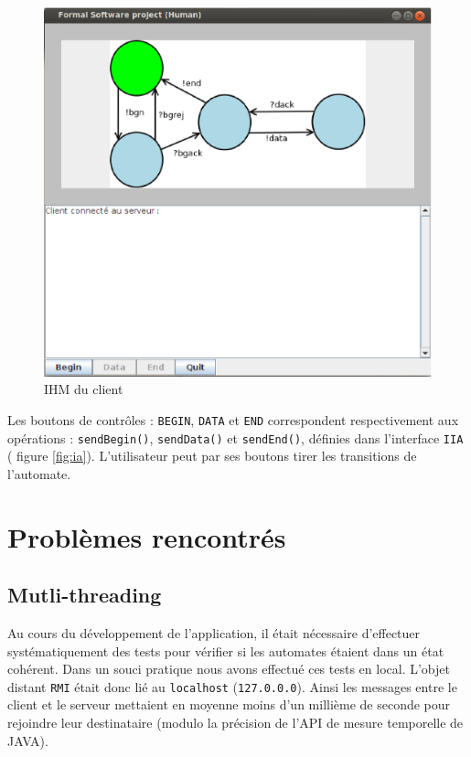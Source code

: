  \begin{figure}[htb]
   \centering
   \includegraphics[scale=.5]{img/ihmCLIENT.eps}
   \caption{IHM du client}
   \label{fig:ihmCLIENT}
 \end{figure}
Les boutons de contrôles :  \texttt{BEGIN}, \texttt{DATA} et \texttt{END} correspondent respectivement aux opérations : \texttt{sendBegin()}, \texttt{sendData()} et \texttt{sendEnd()}, définies dans l'interface \texttt{IIA} (\cf{} figure \ref{fig:ia}). L'utilisateur peut par ses boutons \og tirer \fg{} les transitions de l'automate.

\section{Problèmes rencontrés}
\subsection{Mutli-threading}
Au cours du développement de l'application, il était nécessaire d'effectuer systématiquement des tests pour vérifier si les automates étaient dans un état cohérent. Dans un souci pratique nous avons effectué ces tests en local. L'objet \og distant \fg{} \texttt{RMI} était donc lié au \texttt{localhost} (\verb+127.0.0.0+). Ainsi les messages entre le client et le serveur mettaient en moyenne moins d'un millième de seconde pour rejoindre leur destinataire (modulo la précision de l'API de mesure temporelle de \textsc{JAVA}).

